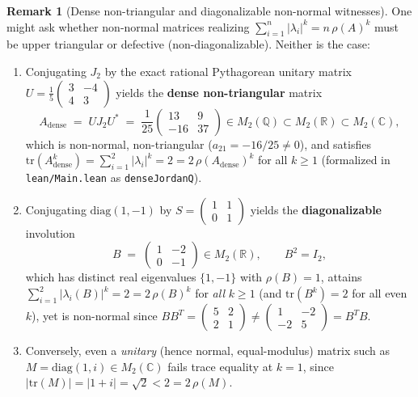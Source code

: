 \documentclass[11pt,a4paper]{article}
\theoremstyle{plain}
\theoremstyle{definition}
\newtheorem{remark}[theorem]{Remark}
\newcommand{\C}{\mathbb{C}}
\newcommand{\R}{\mathbb{R}}
\newcommand{\Q}{\mathbb{Q}}
\newcommand{\tr}{\mathrm{tr}}
\newcommand{\diag}{\mathrm{diag}}
\begin{document}
\begin{remark}[Dense non-triangular and diagonalizable non-normal witnesses]\label{rem:dense-diag}
One might ask whether non-normal matrices realizing $\sum_{i=1}^n |\lambda_i|^k = n\,\rho(A)^k$ must be upper triangular or defective (non-diagonalizable). Neither is the case:
\begin{enumerate}
  \item[(i)] Conjugating $J_2$ by the exact rational Pythagorean unitary matrix $U = \frac{1}{5}\begin{pmatrix} 3 & -4 \\ 4 & 3 \end{pmatrix}$ yields the \textbf{dense non-triangular} matrix
  \[
    A_{\mathrm{dense}} \;=\; U J_2 U^* \;=\; \frac{1}{25}\begin{pmatrix} 13 & 9 \\ -16 & 37 \end{pmatrix} \in M_2(\Q) \subset M_2(\R) \subset M_2(\C),
  \]
  which is non-normal, non-triangular ($a_{21} = -16/25 \ne 0$), and satisfies $\tr(A_{\mathrm{dense}}^k) = \sum_{i=1}^2 |\lambda_i|^k = 2 = 2\,\rho(A_{\mathrm{dense}})^k$ for all $k \ge 1$ (formalized in \texttt{lean/Main.lean} as \texttt{denseJordanQ}).
  \item[(ii)] Conjugating $\diag(1,-1)$ by $S = \begin{pmatrix} 1 & 1 \\ 0 & 1 \end{pmatrix}$ yields the \textbf{diagonalizable} involution
  \[
    B \;=\; \begin{pmatrix} 1 & -2 \\ 0 & -1 \end{pmatrix} \in M_2(\R), \qquad B^2 = I_2,
  \]
  which has distinct real eigenvalues $\{1, -1\}$ with $\rho(B) = 1$, attains $\sum_{i=1}^2 |\lambda_i(B)|^k = 2 = 2\,\rho(B)^k$ for \emph{all} $k \ge 1$ (and $\tr(B^k) = 2$ for all even $k$), yet is non-normal since $B B^T = \begin{pmatrix} 5 & 2 \\ 2 & 1 \end{pmatrix} \ne \begin{pmatrix} 1 & -2 \\ -2 & 5 \end{pmatrix} = B^T B$.
  \item[(iii)] Conversely, even a \emph{unitary} (hence normal, equal-modulus) matrix such as $M = \diag(1, i) \in M_2(\C)$ fails trace equality at $k = 1$, since $|\tr(M)| = |1 + i| = \sqrt{2} < 2 = 2\,\rho(M)$.
\end{enumerate}
\end{remark}
\end{document}
